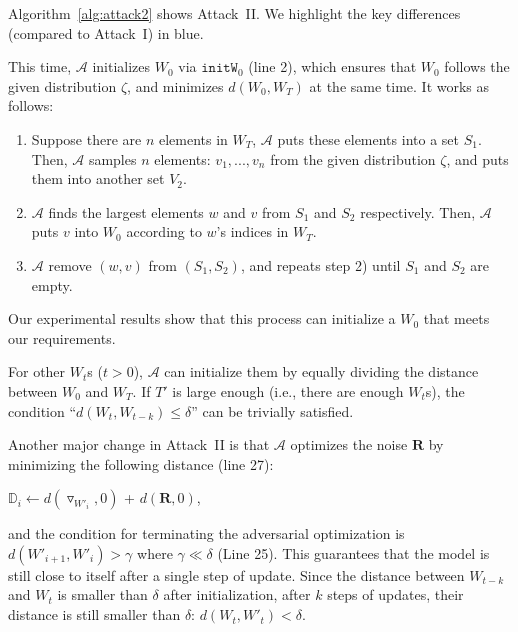 \documentclass[conference]{IEEEtran}
\newcommand{\Adv}{\mathcal{A}\xspace}
\newcommand{\RR}{\mathbf{R}\xspace}
\begin{document}
Algorithm~\ref{alg:attack2} shows Attack~II. We highlight the key differences (compared to Attack~I) in blue.

This time, $\Adv$ initializes $W_0$ via $\texttt{initW}_0$ (line 2), which ensures that $W_0$ follows the given distribution $\zeta$,
and minimizes $d(W_0, W_T)$ at the same time. 
It works as follows:
\begin{enumerate}
    \item Suppose there are $n$ elements in $W_T$,
    $\Adv$ puts these elements into a set $S_1$. Then, $\Adv$ samples $n$ elements: $v_1, ..., v_n$ from the given distribution $\zeta$, and puts them into another set $V_2$.
\item $\Adv$ finds the largest elements $w$ and $v$ from $S_1$ and $S_2$ respectively.
    Then, $\Adv$ puts $v$ into $W_0$ according
    to $w$'s indices in $W_T$.
    \item $\Adv$ remove $(w, v)$ from $(S_1, S_2)$, and repeats step 2) until $S_1$ and $S_2$ are empty.
\end{enumerate}
Our experimental results show that this process can initialize a $W_0$ that meets our requirements. 

For other $W_t$s ($t>0$), $\Adv$ can initialize them by equally dividing the distance between $W_0$ and $W_T$.
If $T'$ is large enough (i.e., there are enough $W_t$s), the condition ``$d(W_t, W_{t-k}) \leq \delta$'' can be trivially satisfied.



Another major {change\EndAccSupp{}} in Attack~II is that $\Adv$ optimizes the noise $\RR$ by minimizing the following distance (line 27):
\begin{center}
    $\mathbb{D}_i \leftarrow d(\triangledown_{W'_i} , 0)$ + $d(\mathbf{R}, 0)$,
\end{center}
and the condition for terminating the adversarial optimization is $d(W'_{i+1}, W'_i) >\gamma$ where $\gamma \ll \delta$ (Line 25).
This guarantees that the model is still close to itself after a single step of update.
Since the distance between $W_{t-k}$ and $W_{t}$ is smaller than $\delta$ after initialization, after $k$ steps of updates, their distance is still smaller than $\delta$: $d(W_t, W'_t) < \delta$.
\end{document}
